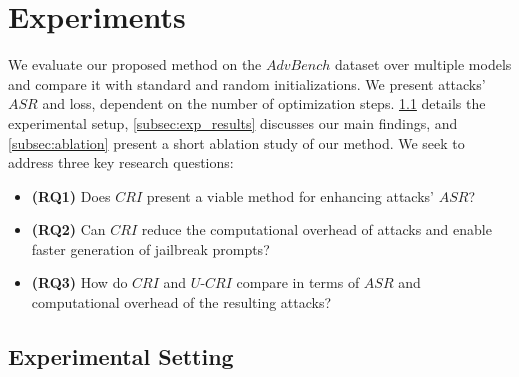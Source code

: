 \section{Experiments}
\label{section:experiments}


    
    

We evaluate our proposed method on the $AdvBench$ dataset \cite{zou2023universal} over multiple models and compare it with standard and random initializations. We present attacks' $ASR$ and loss, dependent on the number of optimization steps. \cref{subsec:exp_setting} details the experimental setup, \cref{subsec:exp_results} discusses our main findings, and \cref{subsec:ablation} present a short ablation study of our method. 
We seek to address three key research questions: 
\begin{itemize}
    \item \textbf{(RQ1)} Does $CRI$ present a viable method for enhancing attacks' $ASR$?
    \item \textbf{(RQ2)} Can $CRI$ reduce the computational overhead of attacks and enable faster generation of jailbreak prompts?    
    \item \textbf{(RQ3)} How do $CRI$ and $U\text{-}CRI$ compare in terms of $ASR$ and computational overhead of the resulting attacks? 
\end{itemize}


\subsection{Experimental Setting}
\label{subsec:exp_setting}

